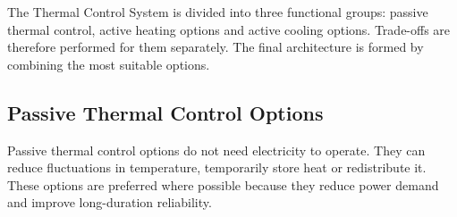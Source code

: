 The Thermal Control System is divided into three functional groups: passive thermal control, active heating options and active cooling options. Trade-offs are therefore performed for them separately. The final architecture is formed by combining the most suitable options.

\subsection*{Passive Thermal Control Options}
\label{subsec:passive_heating_options}

Passive thermal control options do not need electricity to operate. They can reduce fluctuations in temperature, temporarily store heat or redistribute it. These options are preferred where possible because they reduce power demand and improve long-duration reliability.


